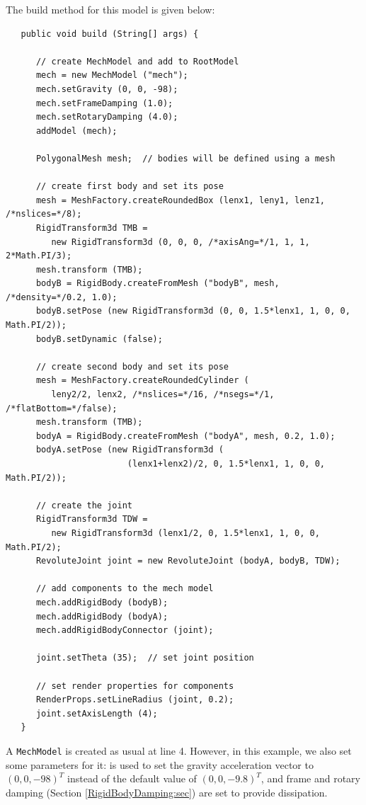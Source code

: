The build method for this model is given below:
\lstset{numbers=left}
\begin{lstlisting}
   public void build (String[] args) {

      // create MechModel and add to RootModel
      mech = new MechModel ("mech");
      mech.setGravity (0, 0, -98);
      mech.setFrameDamping (1.0);
      mech.setRotaryDamping (4.0);
      addModel (mech);

      PolygonalMesh mesh;  // bodies will be defined using a mesh

      // create first body and set its pose
      mesh = MeshFactory.createRoundedBox (lenx1, leny1, lenz1, /*nslices=*/8);
      RigidTransform3d TMB = 
         new RigidTransform3d (0, 0, 0, /*axisAng=*/1, 1, 1, 2*Math.PI/3);
      mesh.transform (TMB);
      bodyB = RigidBody.createFromMesh ("bodyB", mesh, /*density=*/0.2, 1.0);
      bodyB.setPose (new RigidTransform3d (0, 0, 1.5*lenx1, 1, 0, 0, Math.PI/2));
      bodyB.setDynamic (false);

      // create second body and set its pose
      mesh = MeshFactory.createRoundedCylinder (
         leny2/2, lenx2, /*nslices=*/16, /*nsegs=*/1, /*flatBottom=*/false);
      mesh.transform (TMB);
      bodyA = RigidBody.createFromMesh ("bodyA", mesh, 0.2, 1.0);
      bodyA.setPose (new RigidTransform3d (
                        (lenx1+lenx2)/2, 0, 1.5*lenx1, 1, 0, 0, Math.PI/2));

      // create the joint      
      RigidTransform3d TDW = 
         new RigidTransform3d (lenx1/2, 0, 1.5*lenx1, 1, 0, 0, Math.PI/2);
      RevoluteJoint joint = new RevoluteJoint (bodyA, bodyB, TDW);

      // add components to the mech model
      mech.addRigidBody (bodyB);
      mech.addRigidBody (bodyA);
      mech.addRigidBodyConnector (joint);

      joint.setTheta (35);  // set joint position

      // set render properties for components
      RenderProps.setLineRadius (joint, 0.2);
      joint.setAxisLength (4);
   }
\end{lstlisting}
\lstset{numbers=none}

A {\tt MechModel} is created as usual at line 4. However, in this
example, we also set some parameters for it:
 is used to set
the gravity acceleration vector to $(0, 0, -98)^T$ instead of the
default value of $(0, 0, -9.8)^T$, and frame and rotary damping
(Section \ref{RigidBodyDamping:sec}) are set to provide dissipation.

